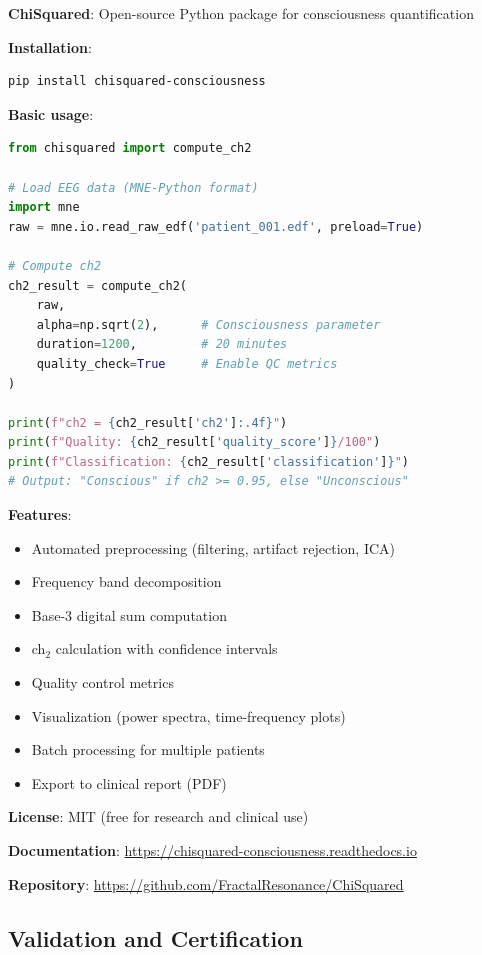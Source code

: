\begin{theorem}\label{thm:software}
\textbf{ChiSquared}: Open-source Python package for consciousness quantification

\textbf{Installation}:
\begin{lstlisting}[language=bash]
pip install chisquared-consciousness
\end{lstlisting}

\textbf{Basic usage}:
\begin{lstlisting}[language=Python]
from chisquared import compute_ch2

# Load EEG data (MNE-Python format)
import mne
raw = mne.io.read_raw_edf('patient_001.edf', preload=True)

# Compute ch2
ch2_result = compute_ch2(
    raw,
    alpha=np.sqrt(2),      # Consciousness parameter
    duration=1200,         # 20 minutes
    quality_check=True     # Enable QC metrics
)

print(f"ch2 = {ch2_result['ch2']:.4f}")
print(f"Quality: {ch2_result['quality_score']}/100")
print(f"Classification: {ch2_result['classification']}")
# Output: "Conscious" if ch2 >= 0.95, else "Unconscious"
\end{lstlisting}

\textbf{Features}:
\begin{itemize}
\item Automated preprocessing (filtering, artifact rejection, ICA)
\item Frequency band decomposition
\item Base-3 digital sum computation
\item ch$_2$ calculation with confidence intervals
\item Quality control metrics
\item Visualization (power spectra, time-frequency plots)
\item Batch processing for multiple patients
\item Export to clinical report (PDF)
\end{itemize}

\textbf{License}: MIT (free for research and clinical use)

\textbf{Documentation}: \url{https://chisquared-consciousness.readthedocs.io}

\textbf{Repository}: \url{https://github.com/FractalResonance/ChiSquared}
\end{theorem}

\subsection{Validation and Certification}

